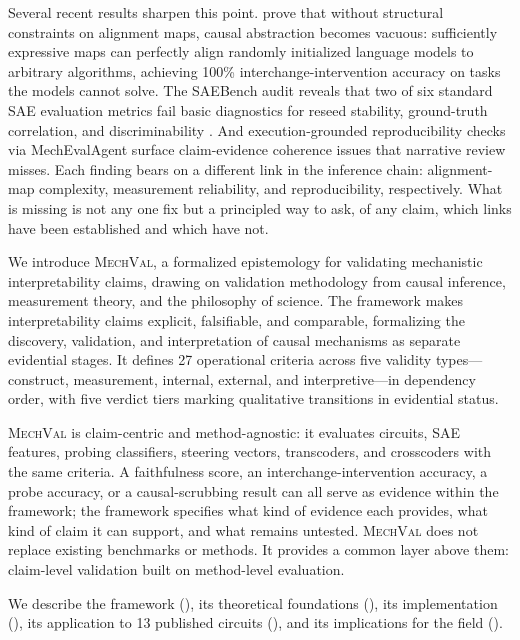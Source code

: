 \documentclass[10pt]{article}
\newcommand{\mechval}{\textsc{MechVal}}
\begin{document}
Several recent results sharpen this point. \citet{sutter2025nonlinear} prove that without
structural constraints on alignment maps, causal abstraction becomes vacuous: sufficiently
expressive maps can perfectly align randomly initialized language models to arbitrary
algorithms, achieving 100\% interchange-intervention accuracy on tasks the models cannot
solve. The SAEBench audit reveals that two of six standard SAE evaluation metrics fail
basic diagnostics for reseed stability, ground-truth correlation, and discriminability
\citep{karvonen2025saebench}. And execution-grounded reproducibility checks via
MechEvalAgent \citep{bai2026mecheval} surface claim-evidence coherence issues that
narrative review misses. Each finding bears on a different link in the inference chain:
alignment-map complexity, measurement reliability, and reproducibility, respectively. What
is missing is not any one fix but a principled way to ask, of any claim, which links have
been established and which have not.

We introduce \mechval{}, a formalized epistemology for validating mechanistic
interpretability claims, drawing on validation methodology from causal inference,
measurement theory, and the philosophy of science. The framework makes interpretability
claims explicit, falsifiable, and comparable, formalizing the discovery, validation, and
interpretation of causal mechanisms as separate evidential stages. It defines 27
operational criteria across five validity types---construct, measurement, internal,
external, and interpretive---in dependency order, with five verdict tiers marking
qualitative transitions in evidential status.

\mechval{} is claim-centric and method-agnostic: it evaluates circuits, SAE features,
probing classifiers, steering vectors, transcoders, and crosscoders with the same
criteria. A faithfulness score, an interchange-intervention accuracy, a probe accuracy, or
a causal-scrubbing result can all serve as evidence within the framework; the framework
specifies what kind of evidence each provides, what kind of claim it can support, and what
remains untested. \mechval{} does not replace existing benchmarks or methods. It provides a
common layer above them: claim-level validation built on method-level evaluation.

We describe the framework (), its theoretical foundations
(), its implementation (), its application
to 13 published circuits (), and its implications for the field
().
\end{document}
